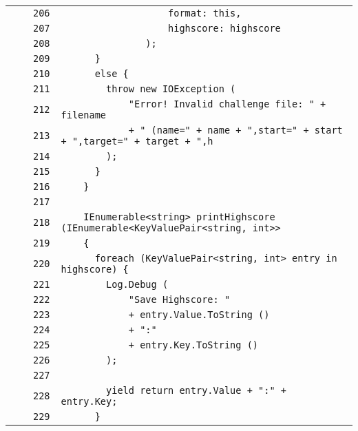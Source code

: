 \documentclass[a4paper,10pt]{article}
\begin{document}
\begin{longtable}[l]{lrrl}
\cellcolor{gray} &  & \verb~206~ & \verb~                   format: this,~\\
\cellcolor{gray} &  & \verb~207~ & \verb~                   highscore: highscore~\\
\cellcolor{gray} &  & \verb~208~ & \verb~               );~\\
\cellcolor{gray} &  & \verb~209~ & \verb~      }~\\
\cellcolor{gray} &  & \verb~210~ & \verb~      else {~\\
\cellcolor{gray} &  & \verb~211~ & \verb~        throw new IOException (~\\
\cellcolor{gray} &  & \verb~212~ & \verb~            "Error! Invalid challenge file: " + filename~\\
\cellcolor{gray} &  & \verb~213~ & \verb~            + " (name=" + name + ",start=" + start + ",target=" + target + ",h~\\
\cellcolor{gray} &  & \verb~214~ & \verb~        );~\\
\cellcolor{gray} &  & \verb~215~ & \verb~      }~\\
\cellcolor{gray} &  & \verb~216~ & \verb~    }~\\
\cellcolor{gray} &  & \verb~217~ & \verb~~\\
\cellcolor{gray} &  & \verb~218~ & \verb~    IEnumerable<string> printHighscore (IEnumerable<KeyValuePair<string, int>>~\\
\cellcolor{gray} &  & \verb~219~ & \verb~    {~\\
\cellcolor{gray} &  & \verb~220~ & \verb~      foreach (KeyValuePair<string, int> entry in highscore) {~\\
\cellcolor{gray} &  & \verb~221~ & \verb~        Log.Debug (~\\
\cellcolor{gray} &  & \verb~222~ & \verb~            "Save Highscore: "~\\
\cellcolor{gray} &  & \verb~223~ & \verb~            + entry.Value.ToString ()~\\
\cellcolor{gray} &  & \verb~224~ & \verb~            + ":"~\\
\cellcolor{gray} &  & \verb~225~ & \verb~            + entry.Key.ToString ()~\\
\cellcolor{gray} &  & \verb~226~ & \verb~        );~\\
\cellcolor{gray} &  & \verb~227~ & \verb~~\\
\cellcolor{gray} &  & \verb~228~ & \verb~        yield return entry.Value + ":" + entry.Key;~\\
\cellcolor{gray} &  & \verb~229~ & \verb~      }~\\

\end{longtable}
\end{document}
